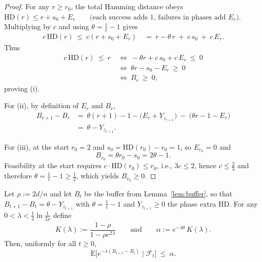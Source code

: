 \documentclass[lettersize,journal]{IEEEtran}
\newcommand{\EE}{\text{E}}
\newcommand{\HD}{\text{HD}}
\begin{document}
\begin{proof}
	For any $r\ge r_0$, the total Hamming distance obeys
$
		\HD(r)\le r+s_0+E_r
		\qquad\text{(each success adds $1$, failures in phases add $E_r$).}
$
	Multiplying by $c$ and using $\theta=\frac{1}{c}-1$ gives
	\begin{align*}
		c\,\HD(r)\ \le\ c(r+s_0+E_r)
		\ &=\ r - \theta\,r\ +\ c\,s_0\ +\ c\,E_r.
	\end{align*}
	Thus
	\begin{align*}
		c\,\HD(r)\ \le\ r
		\ &\Longleftrightarrow\ 
		-\theta r + c\,s_0 + c\,E_r\ \le\ 0
		\\&\Longleftrightarrow\ 
		\theta r - s_0 - E_r\ \ge\ 0
		\\&\Longleftrightarrow\ 
		B_r\ \ge\ 0,
	\end{align*}
	proving (i).
	
	For (ii), by definition of $E_r$ and $B_r$,
	\begin{align*}
		B_{r+1}-B_r
		&=\ \theta(r+1)-1-\big(E_r+Y_{z_{r+1}}\big)\ -\ \big(\theta r-1-E_r\big)
		\\&=\ \theta - Y_{z_{r+1}}.
	\end{align*}
	
	For (iii), at the start $r_0=2$ and $s_0=\HD(r_0)-r_0=1$, so $E_{r_0}=0$ and
	\[
	B_{r_0}=\theta r_0 - s_0 = 2\theta - 1.
	\]
	Feasibility at the start requires $c\cdot \HD(r_0)\le r_0$, i.e., $3c\le 2$, hence $c\le \tfrac{2}{3}$ and therefore $\theta=\tfrac{1}{c}-1\ge \tfrac12$, which yields $B_{r_0}\ge 0$.
\end{proof}
\begin{lemma}\label{lem:drift-envelope-global}
	Let $\rho:=2d/n$ and let $B_t$ be the buffer from Lemma~\ref{lem:buffer}, so that
	$B_{t+1}-B_t=\theta-Y_{z_{t+1}}$ with $\theta=\tfrac{1}{c}-1$ and $Y_{z_{t+1}}\ge 0$ the phase extra HD.
	For any $0<\lambda<\tfrac12\ln\!\tfrac{1}{2\rho}$ define
	\[
	K(\lambda):=\frac{1-\rho}{1-\rho e^{2\lambda}}
	\qquad\text{and}\qquad
	\alpha:=e^{-\lambda\theta}\,K(\lambda).
	\]
	Then, uniformly for all $t\ge 0$,
	\[
	\EE\!\big[e^{-\lambda(B_{t+1}-B_t)}\mid \mathcal F_t\big]\ \le\ \alpha.
	\]
\end{lemma}
\end{document}
